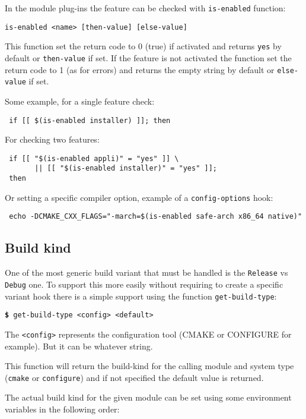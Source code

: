 \documentclass[a4paper,12pt,twoside]{article}
\newcommand{\code}[1]{\texttt{#1}}
\newcommand{\cmd}[1]{\tabto{1cm}\hspace{0.5cm}\texttt{\textbf{\$} #1}}
\begin{document}
In the module plug-ins the feature can be checked with \code{is-enabled} function:

\code{is-enabled <name> [then-value] [else-value]}

This function set the return code to 0 (true) if activated and returns \code{yes} by default or \code{then-value} if set. If the feature is not activated the function set the return code to 1 (as for errors) and returns the empty string by default or \code{else-value} if set.

Some example, for a single feature check:

\begin{lstlisting}
 if [[ $(is-enabled installer) ]]; then
\end{lstlisting}

For checking two features:

\begin{lstlisting}
 if [[ "$(is-enabled appli)" = "yes" ]] \
       || [[ "$(is-enabled installer)" = "yes" ]];
 then
\end{lstlisting}

Or setting a specific compiler option, example of a \code{config-options} hook:

\begin{lstlisting}
 echo -DCMAKE_CXX_FLAGS="-march=$(is-enabled safe-arch x86_64 native)"
\end{lstlisting}

\subsection{Build kind}
 

One of the most generic build variant that must be handled is the \code{Release} vs \code{Debug} one. To support this more easily without requiring to create a specific variant hook there is a simple support using the function \code{get-build-type}:

\cmd{get-build-type <config> <default>}

The \code{<config>} represents the configuration tool (CMAKE or CONFIGURE for example). But it can be whatever string.

This function will return the build-kind for the calling module and system type (\code{cmake} or \code{configure}) and if not specified the default value is returned.

The actual build kind for the given module can be set using some environment variables in the following order:
\end{document}
